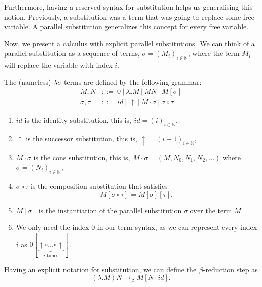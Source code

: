 Furthermore, having a reserved syntax for substitution helps us generalising this notion.
Previously, a substitution  was a term that was going to replace some free variable.
A parallel substitution generalizes this concept for every free variable. 

Now, we present a calculus with explicit parallel substitutions.
We can think of a parallel substitution as a sequence of terms, $\sigma = (M_i)_{i \in \mathbb{N}}$, where the term $M_i$ will replace the variable with index $i$.


\begin{definition}
  The (nameless) $\lambda \sigma$-terms are defined by the following grammar:  
  \begin{align*}
    M, N         &::= \ 0 \ | \ \lambda . M \ | \ M N \ | \ M[\sigma] \\
    \sigma, \tau &::= \ id \ | \ \uparrow \ | \ M \cdot \sigma \ | \ \sigma \circ \tau
  \end{align*}
\end{definition}

\begin{remark} \hfill
	\begin{enumerate}
		\item $id$ is the identity substitution, this is, $id = (i)_{i \in \mathbb{N}}$,
		\item $\uparrow$ is the successor substitution, this is, $\uparrow = (i+1)_{i \in \mathbb{N}}$,
		\item $M \cdot \sigma$ is the cons substitution, this is, $M \cdot \sigma = (M, N_0, N_1, N_2, \dots)$ where $\sigma = (N_i)_{i \in \mathbb{N}}$,
		\item $\sigma \circ \tau$ is the composition substitution that satisfies
		\[ M[\sigma \circ \tau] = M[\sigma][\tau], \]
		\item $M[\sigma]$ is the instantiation of the parallel substitution $\sigma$ over the term $M$
		\item We only need the index 0 in our term syntax, as we can represent every index $i$ as $0[\underbrace{\uparrow \circ \dots \circ \uparrow}_{\text{$i$ times}}]$.
	\end{enumerate}
\end{remark}

Having an explicit notation for substitution, we can define the $\beta$-reduction step as 
\[ (\lambda . M) N \to_\beta M[N \cdot id]. \]

